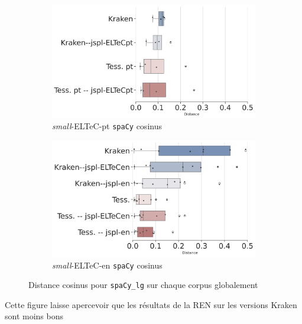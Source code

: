 \begin{figure}[h!]
    \begin{subfigure}{0.45\textwidth}
  \includegraphics[height=.57\textwidth]{IMAGES/Boite-a_moustache_12072024/ELTeC_Por_spaCy3.5.1/ELTeC_Por_spaCy3.5.1-lg-cosinus-sim2-3.png} 
        \caption{\textit{small}-ELTeC-pt \texttt{spaCy} cosinus} 
         \label{fig:ELTeC-Por-spaCy-cosinus}
   \end{subfigure}
    \begin{subfigure}{0.45\textwidth}
  \includegraphics[height=.58\textwidth]{IMAGES/Boite-a_moustache_12072024/ELTeC_eng_spaCy3.5.1/ELTeC_eng_spaCy3.5.1-lg-cosinus-sim2-3.png}
        \caption{\textit{small}-ELTeC-en \texttt{spaCy} cosinus}
        \label{fig:Cosinus-spaCy-lg-ELTeC-eng}
   \end{subfigure}

    \caption{Distance cosinus pour \texttt{spaCy\_lg} sur chaque corpus globalement}
\label{fig:Cosinus-spacy-lg}
\end{figure}
Cette figure laisse apercevoir que les résultats de la REN sur les versions Kraken sont moins bons 

